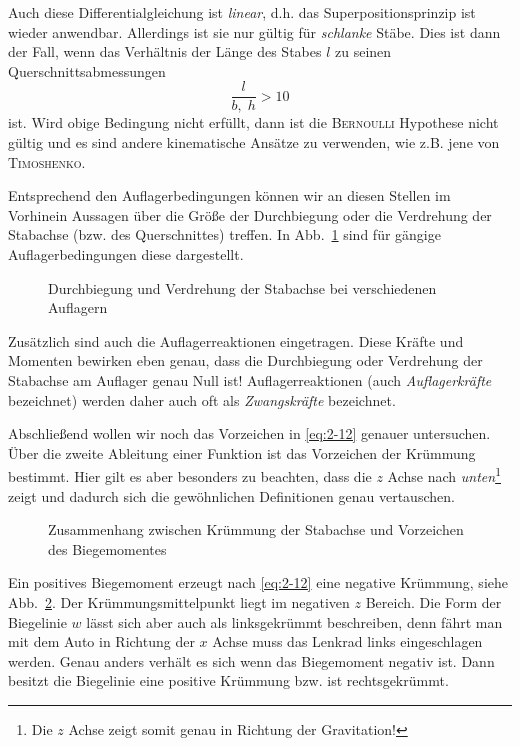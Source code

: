 Auch diese Differentialgleichung ist \emph{linear}, d.h. das Superpositionsprinzip ist wieder anwendbar.
Allerdings ist sie nur gültig für \emph{schlanke} Stäbe.
Dies ist dann der Fall, wenn das Verhältnis der Länge des Stabes $l$ zu seinen Querschnittsabmessungen
%
\begin{equation}
\dfrac{l}{b,\; h} > 10
\end{equation}
%
ist. Wird obige Bedingung nicht erfüllt, dann ist die \textsc{Bernoulli} Hypothese nicht gültig und es sind andere kinematische Ansätze zu verwenden, wie z.B. jene von \textsc{Timoshenko}.

Entsprechend den Auflagerbedingungen können wir an diesen Stellen im Vorhinein Aussagen über die Größe der Durchbiegung oder die Verdrehung der Stabachse (bzw. des Querschnittes) treffen.
In Abb.~\ref{fig:2-8a} sind für gängige Auflagerbedingungen diese dargestellt. 
%
\begin{figure}[h!]
	\centering
	
	\caption{Durchbiegung und Verdrehung der Stabachse bei verschiedenen Auflagern}
	\label{fig:2-8a}
\end{figure}
%
Zusätzlich sind auch die Auflagerreaktionen eingetragen.
Diese Kräfte und Momenten bewirken eben genau, dass die Durchbiegung oder Verdrehung der Stabachse am Auflager genau Null ist!
Auflagerreaktionen (auch \emph{Auflagerkräfte} bezeichnet) werden daher auch oft als \emph{Zwangskräfte} bezeichnet. 

Abschließend wollen wir noch das Vorzeichen in \eqref{eq:2-12} genauer untersuchen.
Über die zweite Ableitung einer Funktion ist das Vorzeichen der Krümmung bestimmt.
Hier gilt es aber besonders zu beachten, dass die $z$ Achse nach \emph{unten}\footnote{Die $z$ Achse zeigt somit genau in Richtung der Gravitation!} zeigt und dadurch sich die gewöhnlichen Definitionen genau vertauschen.
%
\begin{figure}[h!]
	\centering
	
	\caption{Zusammenhang zwischen Krümmung der Stabachse und Vorzeichen des Biegemomentes}
	\label{fig:2-8}
\end{figure}
%
Ein positives Biegemoment erzeugt nach \eqref{eq:2-12} eine negative Krümmung, siehe Abb.~\ref{fig:2-8}.
Der Krümmungsmittelpunkt liegt im negativen $z$ Bereich.
Die Form der Biegelinie $w$ lässt sich aber auch als linksgekrümmt beschreiben, denn fährt man mit dem Auto in Richtung der $x$ Achse muss das Lenkrad links eingeschlagen werden.
Genau anders verhält es sich wenn das Biegemoment negativ ist.
Dann besitzt die Biegelinie eine positive Krümmung bzw. ist rechtsgekrümmt.

